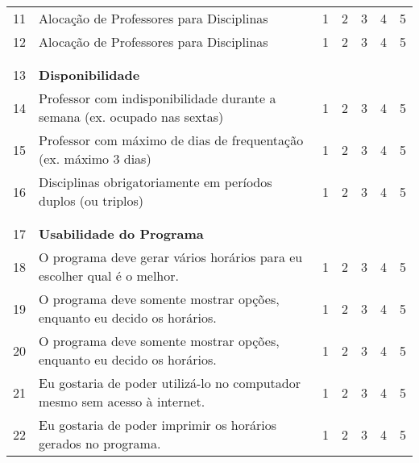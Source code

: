\documentclass[12pt,a4paper]{article}
\def\numcirc#1{\large\textcircled{\small{#1}}}
\begin{document}
\begin{center}
\begin{tabular}{ r l  c  c  c  c  c }
				11	& Alocação de Professores para Disciplinas											& \numcirc{1} & \numcirc{2} & \numcirc{3} & \numcirc{4} & \numcirc{5} \\
				12	& Alocação de Professores para Disciplinas											& \numcirc{1} & \numcirc{2} & \numcirc{3} & \numcirc{4} & \numcirc{5} \\
				\\\hline\\
				13	& \textbf{Disponibilidade}															&             &             &             &             &			  \\
				14	& Professor com indisponibilidade durante a semana (ex. ocupado nas sextas)			& \numcirc{1} & \numcirc{2} & \numcirc{3} & \numcirc{4} & \numcirc{5} \\
				15	& Professor com máximo de dias de frequentação (ex. máximo 3 dias)			      	& \numcirc{1} & \numcirc{2} & \numcirc{3} & \numcirc{4} & \numcirc{5} \\
				16	& Disciplinas obrigatoriamente em períodos duplos (ou triplos) 						& \numcirc{1} & \numcirc{2} & \numcirc{3} & \numcirc{4} & \numcirc{5} \\
				\\\hline\\
				17	& \textbf{Usabilidade do Programa}													&             &             &             &             &			  \\
				18	& O programa deve gerar vários horários para eu escolher qual é o melhor.			& \numcirc{1} & \numcirc{2} & \numcirc{3} & \numcirc{4} & \numcirc{5} \\
				19	& O programa deve somente mostrar opções, enquanto eu decido os horários.			& \numcirc{1} & \numcirc{2} & \numcirc{3} & \numcirc{4} & \numcirc{5} \\
				20	& O programa deve somente mostrar opções, enquanto eu decido os horários.			& \numcirc{1} & \numcirc{2} & \numcirc{3} & \numcirc{4} & \numcirc{5} \\
				21	& Eu gostaria de poder utilizá-lo no computador mesmo sem acesso à internet.		& \numcirc{1} & \numcirc{2} & \numcirc{3} & \numcirc{4} & \numcirc{5} \\
				22	& Eu gostaria de poder imprimir os horários gerados no programa.					& \numcirc{1} & \numcirc{2} & \numcirc{3} & \numcirc{4} & \numcirc{5} \\
				\hline
			\end{tabular}
		\end{center}
\end{document}
